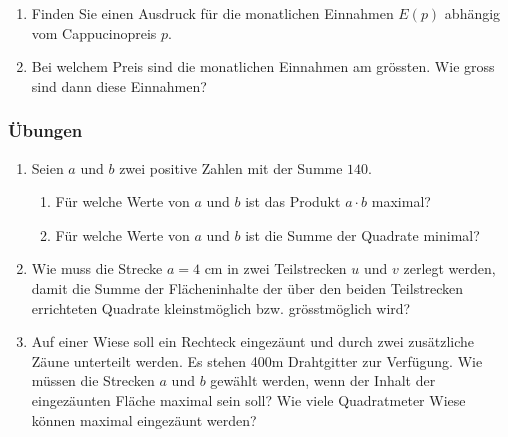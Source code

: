\begin{enumerate}
    \item Finden Sie einen Ausdruck für die monatlichen Einnahmen $E(p)$ abhängig vom Cappucinopreis $p$.
    \item Bei welchem Preis sind die monatlichen Einnahmen am grössten. Wie gross sind dann diese Einnahmen?
\end{enumerate}
\newpage
\subsubsection{Übungen}
\begin{enumerate}
    \item Seien $a$ und $b$ zwei positive Zahlen mit der Summe $140$.
          \begin{enumerate}
              \item Für welche Werte von $a$ und $b$ ist das Produkt $a\cdot b$ maximal?
              \item Für welche Werte von $a$ und $b$ ist die Summe der Quadrate minimal?
          \end{enumerate}
    \item Wie muss die Strecke $a=4$ cm in zwei Teilstrecken $u$ und $v$ zerlegt werden, damit die Summe der Flächeninhalte der über den beiden Teilstrecken errichteten Quadrate kleinstmöglich bzw. grösstmöglich wird?
    \item \begin{minipage}[t]{0.7\textwidth}
              Auf einer Wiese soll ein Rechteck eingezäunt und durch zwei zusätzliche Zäune unterteilt werden. Es stehen 400m Drahtgitter zur Verfügung. Wie müssen die Strecken $a$ und $b$ gewählt werden, wenn der Inhalt der eingezäunten Fläche maximal sein soll? Wie viele Quadratmeter Wiese können maximal eingezäunt werden?
          \end{minipage}
          \begin{minipage}[t]{0.3\textwidth}
              \vspace{0pt}
\end{minipage}
\end{enumerate}

